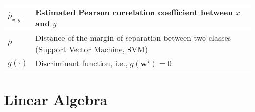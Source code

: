 \documentclass{article}
\begin{document}
\begin{xltabular}{\textwidth}{XX}
	\(\hat{\rho}_{x,y}\)                                                                                                  & Estimated Pearson correlation coefficient between \(x\) and \(y\)                                                                                                                                                            \\ \hline
	\(\rho\)                                                                                                              & Distance of the margin of separation between two classes (Support Vector Machine, SVM)                                                                                                                                       \\ \hline
	\(g(\cdot)\)                                                                                                          & Discriminant function, i.e., \(g(\mathbf{w}^{\star}) = 0\)
\end{xltabular}

\section{Linear Algebra}
\end{document}
